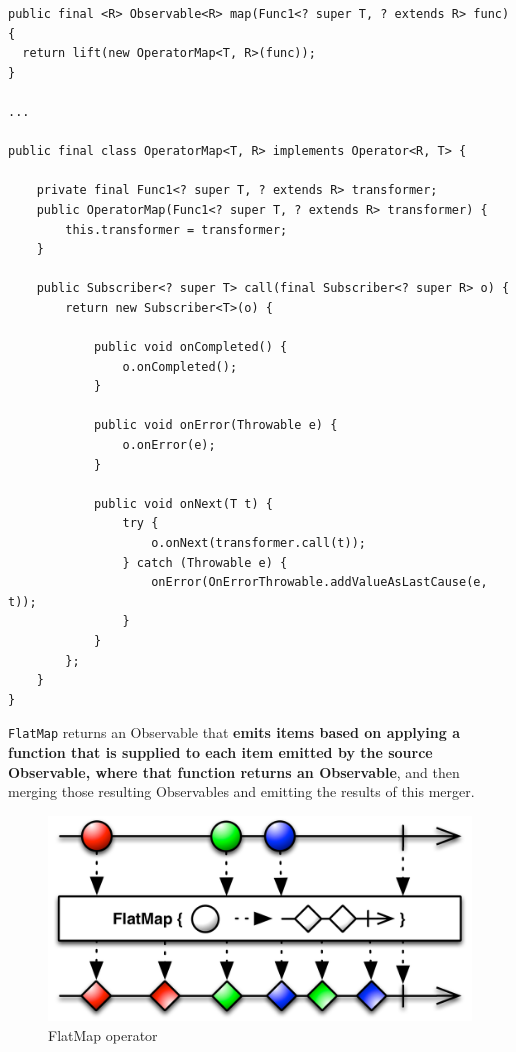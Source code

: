 \begin{verbatim}
public final <R> Observable<R> map(Func1<? super T, ? extends R> func) {
  return lift(new OperatorMap<T, R>(func));
}

...

public final class OperatorMap<T, R> implements Operator<R, T> {

    private final Func1<? super T, ? extends R> transformer;
    public OperatorMap(Func1<? super T, ? extends R> transformer) {
        this.transformer = transformer;
    }

    public Subscriber<? super T> call(final Subscriber<? super R> o) {
        return new Subscriber<T>(o) {

            public void onCompleted() {
                o.onCompleted();
            }

            public void onError(Throwable e) {
                o.onError(e);
            }

            public void onNext(T t) {
                try {
                    o.onNext(transformer.call(t));
                } catch (Throwable e) {
                    onError(OnErrorThrowable.addValueAsLastCause(e, t));
                }
            }
        };
    }
}
\end{verbatim}

\label{flatmap}

\texttt{FlatMap} returns an Observable that \textbf{emits items based on
applying a function that is supplied to each item emitted by the source
Observable, where that function returns an Observable}, and then merging
those resulting Observables and emitting the results of this merger.

\begin{figure}[htbp]
\centering
\includegraphics[scale=0.5]{imgs/flatMap.png}
\caption{FlatMap operator}
\end{figure}

